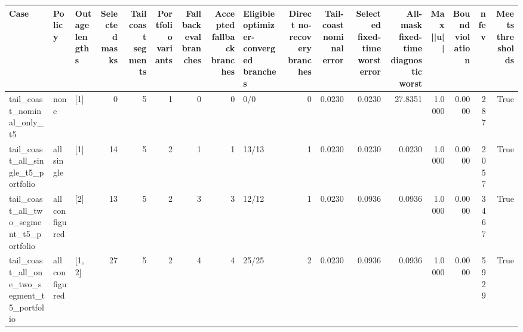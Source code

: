 \begin{tabular}{lllrrrrrlrrrrrrrr}
\toprule
Case & Policy & Outage lengths & Selected masks & Tail coast segments & Portfolio variants & Fallback eval branches & Accepted fallback branches & Eligible optimizer-converged branches & Direct no-recovery branches & Tail-coast nominal error & Selected fixed-time worst error & All-mask fixed-time diagnostic worst & Max ||u|| & Bound violation & nfev & Meets thresholds \\
\midrule
tail\_coast\_nominal\_only\_t5 & none & [1] & 0 & 5 & 1 & 0 & 0 & 0/0 & 0 & 0.0230 & 0.0230 & 27.8351 & 1.0000 & 0.0000 & 287 & True \\
tail\_coast\_all\_single\_t5\_portfolio & all single & [1] & 14 & 5 & 2 & 1 & 1 & 13/13 & 1 & 0.0230 & 0.0230 & 0.0230 & 1.0000 & 0.0000 & 2057 & True \\
tail\_coast\_all\_two\_segment\_t5\_portfolio & all configured & [2] & 13 & 5 & 2 & 3 & 3 & 12/12 & 1 & 0.0230 & 0.0936 & 0.0936 & 1.0000 & 0.0000 & 3467 & True \\
tail\_coast\_all\_one\_two\_segment\_t5\_portfolio & all configured & [1, 2] & 27 & 5 & 2 & 4 & 4 & 25/25 & 2 & 0.0230 & 0.0936 & 0.0936 & 1.0000 & 0.0000 & 5929 & True \\
\bottomrule
\end{tabular}
